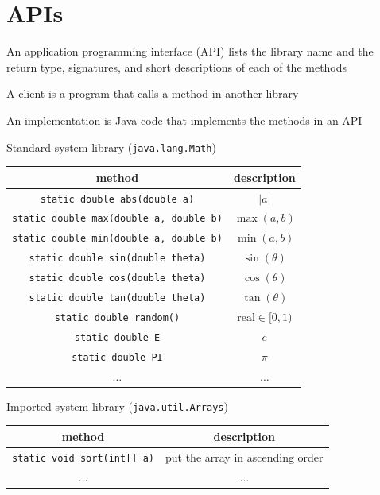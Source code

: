 \documentclass[8pt,a4paper,compress]{beamer}
\begin{document}
\section{APIs}
\begin{frame}[fragile]
\pause

An application programming interface (API) lists the library name and the return type, signatures, and short descriptions of each of the methods

\pause
\bigskip

A client is a program that calls a method in another library

\pause
\bigskip

An implementation is Java code that implements the methods in an API

\pause
\bigskip

Standard system library (\lstinline{java.lang.Math})
\begin{center}
\begin{tabular}{cc}
method & description \\ \hline
\lstinline$static double abs(double a)$  & $|a|$ \\
\lstinline$static double max(double a, double b)$  & $\max(a, b)$ \\
\lstinline$static double min(double a, double b)$  & $\min(a, b)$ \\
\lstinline$static double sin(double theta)$  & $\sin(\theta)$ \\
\lstinline$static double cos(double theta)$  & $\cos(\theta)$ \\
\lstinline$static double tan(double theta)$  & $\tan(\theta)$ \\
\lstinline$static double random()$ & $\text{real} \in [0, 1)$ \\
\lstinline$static double E$ & $e$ \\
\lstinline$static double PI$ & $\pi$ \\
$\dots$ & $\dots$ 
\end{tabular} 
\end{center}

\pause
\bigskip

Imported system library (\lstinline{java.util.Arrays})
\begin{center}
\begin{tabular}{cc}
method & description \\ \hline
\lstinline$static void sort(int[] a)$ & put the array in ascending order \\
$\dots$ & $\dots$ 
\end{tabular} 
\end{center}
\end{frame}
\end{document}
